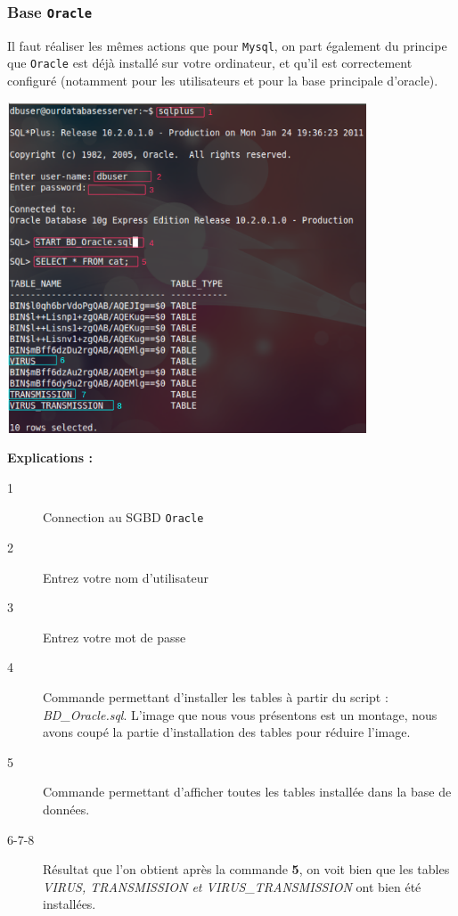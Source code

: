 \documentclass[12pt]{article}
\begin{document}
	\subsubsection{Base \texttt{Oracle}}
	Il faut réaliser les mêmes actions que pour \texttt{Mysql}, on part également du principe que \texttt{Oracle} est déjà installé sur votre ordinateur, et qu'il est correctement configuré (notamment pour les utilisateurs et pour la base principale d'oracle).
	\begin{center}
	\includegraphics[width=0.80\textwidth]{Image/TerminalOracle.png}
\end{center}
		\textbf{Explications : }
	\begin{description}
		\item [1] Connection au SGBD \texttt{Oracle}
		\item [2] Entrez votre nom d'utilisateur
		\item [3] Entrez votre mot de passe
		\item [4] Commande permettant d'installer les tables à partir du script : \textit{BD\_Oracle.sql}. L'image que nous vous présentons est un montage, nous avons coupé la partie d'installation des tables pour réduire l'image.
		\item [5] Commande permettant d'afficher toutes les tables installée dans la base de données.
		\item [6-7-8] Résultat que l'on obtient après la commande \textbf{5}, on voit bien que les tables \textit{VIRUS, TRANSMISSION et VIRUS\_TRANSMISSION} ont bien été installées.
	\end{description}
\end{document}
